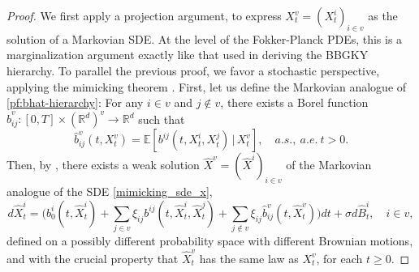 \documentclass[11pt,reqno]{amsart}
\numberwithin{equation}{section}
\theoremstyle{definition}
\def\E{{\mathbb E}}
\def\R{{\mathbb R}}
\begin{document}
		\begin{proof}
We first apply a projection argument, to express $X^v_t=(X^i_t)_{i \in v}$ as the solution of a Markovian SDE. At the level of the Fokker-Planck PDEs, this is a marginalization argument exactly like that used in deriving the BBGKY hierarchy. To parallel the previous proof, we favor a stochastic perspective, applying the mimicking theorem \cite[Corollary 3.7]{brunickshreve}. First, let us define the Markovian analogue of \eqref{pf:bhat-hierarchy}: For any $i \in v$ and $j \notin v $, there exists a Borel function $ \widehat{b}^v_{ij} : [0, T] \times  (\R^d)^v\to \R^d $ such that
		\begin{equation*}
			\widehat{b}^v_{ij} (t, X^v_t) = \E[b^{ij}(t, X^i_t, X^j_t) \, | \, X^v_t], \quad a.s., \ a.e. \  t > 0. 
		\end{equation*}
Then, by \cite[Corollary 3.7]{brunickshreve}, there exists  a weak solution $\widehat{X}^v=(\widehat{X}^i)_{i \in v}$ of the Markovian analogue of the SDE \eqref{mimicking_sde_x},
\begin{equation}  \label{mimicking_sde_x-Markov}
d \widehat{X}^{i}_t = \Big(b_0^{i}(t, \widehat{X}^i_t) +  \sum_{ j \in v} \xi_{ij} b^{ij}(t, \widehat{X}^i_t, \widehat{X}^j_t) + \sum_{j \notin v} \xi_{ij} 	\widehat{b}^v_{ij} (t, \widehat{X}^v_t )\Big) dt + \sigma d \widehat{B}^i_t, \quad i \in v,
\end{equation}
defined on a possibly different probability space with different Brownian motions, and with the crucial property that $\widehat{X}^v_t$ has the same law as $X^v_t$, for each $t \ge 0$.



\end{proof}
\end{document}
